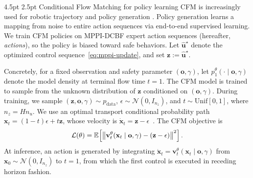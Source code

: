 \documentclass[letterpaper, 10 pt, conference]{ieeeconf}
\makeatletter
\renewcommand{\o}{\mathbf{o}}
\newcommand{\x}{\mathbf{x}}
\newcommand{\z}{\mathbf{z}}
\renewcommand{\subsection}{%
  \@startsection{subsection}{2}{\z@}%
  {4.5pt}%
  {2.5pt}%
  {\normalfont\normalsize\itshape}}
\makeatother
\begin{document}
\subsection{Conditional Flow Matching for policy learning}
CFM is increasingly used for robotic trajectory and policy generation \cite{Kurtz_GPC,mizuta2025unified}.
Policy generation learns a mapping from noise to entire action sequences via end-to-end supervised learning.
We train CFM policies on MPPI-DCBF expert action sequences (hereafter, \emph{actions}), so the policy is biased toward safe behaviors. 
Let $\hat{\mathbf u}^{\star}$ denote the optimized control sequence~\eqref{eq:mppi-update}, and set
$\z:=\hat{\mathbf u}^{\star}$. 

Concretely, for a fixed observation and safety parameter \((\o,\gamma)\), let $p_1^\theta(\cdot\mid\o,\gamma)$ denote the model density at terminal flow time $t=1$.
The CFM model is trained to sample from the unknown distribution of $\z$ conditioned on \((\o,\gamma)\).
During training, we sample $(\z,\o,\gamma)\sim p_{\mathrm{data}}$, $\epsilon\sim\mathcal N(0,I_{n_z})$, and $t\sim\mathrm{Unif}[0,1]$, where $n_z=Hn_u$.
We use an optimal transport conditional probability path $\x_t\!=\!(1-t)\epsilon+t\z$, whose velocity is $\dot{\x}_t=\z-\epsilon$~\cite{lipman2022flow}. 
The CFM objective is
\begin{equation}
\mathcal{L}(\theta)=
\mathbb{E}_{
}\!
\left[
\left\|
\mathbf v_t^\theta(\x_t\mid\o,\gamma)-(\z-\epsilon)
\right\|^2
\right].
\label{eq:cfm-loss}
\end{equation}
At inference, an action is generated by integrating 
$\dot{\x}_t=\mathbf v_t^\theta(\x_t\!\mid\!\o,\gamma)$
from $\x_0\sim\mathcal N(0,I_{n_z})$ to $t=1$, from which the first control is executed in receding horizon fashion.
\end{document}
